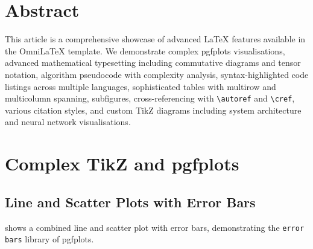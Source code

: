 \documentclass[
    language=english,
    doctype=article,
    institution=none,
    titlestyle=book,
]{../../omnilatex}
\theoremstyle{definition}
\theoremstyle{definition}
\theoremstyle{remark}
\begin{document}
\maketitle

\section*{Abstract}
This article is a comprehensive showcase of advanced \LaTeX{} features available in
the OmniLaTeX template.  We demonstrate complex pgfplots visualisations, advanced
mathematical typesetting including commutative diagrams and tensor notation,
algorithm pseudocode with complexity analysis, syntax-highlighted code listings
across multiple languages, sophisticated tables with multirow and multicolumn
spanning, subfigures, cross-referencing with \verb|\autoref| and \verb|\cref|,
various citation styles, and custom TikZ diagrams including system architecture
and neural network visualisations.

\tableofcontents

\section{Complex TikZ and pgfplots}
\label{sec:pgfplots}

\subsection{Line and Scatter Plots with Error Bars}
\label{sec:line-scatter}

 shows a combined line and scatter plot with error bars,
demonstrating the \texttt{error bars} library of pgfplots.
\end{document}
